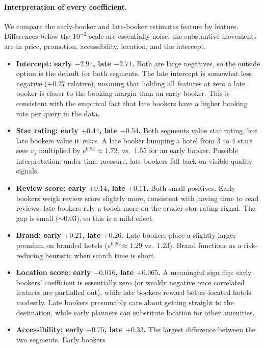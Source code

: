 \documentclass[11pt]{article}
\begin{document}
\paragraph{Interpretation of every coefficient.}
We compare the early-booker and late-booker estimates feature by feature.
Differences below the $10^{-2}$ scale are essentially noise; the
substantive movements are in price, promotion, accessibility, location,
and the intercept.
\begin{itemize}
  \item \textbf{Intercept: early $-2.97$, late $-2.71$.}
    Both are large negatives, so the outside option is the default for
    both segments. The late intercept is somewhat less negative
    ($+0.27$ relative), meaning that holding all features at zero a
    late booker is closer to the booking margin than an early booker.
    This is consistent with the empirical fact that late bookers have
    a higher booking rate per query in the data.
  \item \textbf{Star rating: early $+0.44$, late $+0.54$.}
    Both segments value star rating, but late bookers value it
    \emph{more}. A late booker bumping a hotel from 3 to 4 stars sees
    $v_j$ multiplied by $e^{0.54}\approx 1.72$, vs.\ $1.55$ for an
    early booker. Possible interpretation: under time pressure, late
    bookers fall back on visible quality signals.
  \item \textbf{Review score: early $+0.14$, late $+0.11$.}
    Both small positives. Early bookers weigh review score slightly
    more, consistent with having time to read reviews; late bookers
    rely a touch more on the cruder star rating signal. The gap is
    small ($\sim\!0.03$), so this is a mild effect.
  \item \textbf{Brand: early $+0.21$, late $+0.26$.}
    Late bookers place a slightly larger premium on branded hotels
    ($e^{0.26}\approx 1.29$ vs.\ $1.23$). Brand functions as a
    risk-reducing heuristic when search time is short.
  \item \textbf{Location score: early $-0.016$, late $+0.065$.}
    A meaningful sign flip: early bookers' coefficient is essentially
    zero (or weakly negative once correlated features are partialled
    out), while late bookers reward better-located hotels modestly.
    Late bookers presumably care about getting straight to the
    destination, while early planners can substitute location for
    other amenities.
  \item \textbf{Accessibility: early $+0.75$, late $+0.33$.}
    The largest difference between the two segments. Early bookers

\end{itemize}
\end{document}
